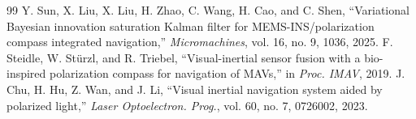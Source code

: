 \documentclass[conference]{IEEEtran}
\begin{document}
\begin{thebibliography}{99}
 Y. Sun, X. Liu, X. Liu, H. Zhao, C. Wang, H. Cao, and C. Shen, ``Variational Bayesian innovation saturation Kalman filter for MEMS-INS/polarization compass integrated navigation,'' \emph{Micromachines}, vol. 16, no. 9, 1036, 2025.
 F. Steidle, W. St\"urzl, and R. Triebel, ``Visual-inertial sensor fusion with a bio-inspired polarization compass for navigation of MAVs,'' in \emph{Proc. IMAV}, 2019.
 J. Chu, H. Hu, Z. Wan, and J. Li, ``Visual inertial navigation system aided by polarized light,'' \emph{Laser Optoelectron. Prog.}, vol. 60, no. 7, 0726002, 2023.
\end{thebibliography}
\end{document}
